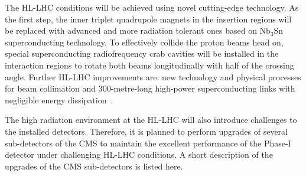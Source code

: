 The HL-LHC conditions will be achieved using novel cutting-edge technology. As the first step, the inner triplet quadrupole magnets in the insertion regions will be replaced with advanced and more radiation tolerant ones based on $\text{Nb}_{3}\text{Sn}$ superconducting technology. To effectively collide the proton beams head on, special superconducting radiofrequency crab cavities will be installed in the interaction regions to rotate both beams longitudinally with half of the crossing angle. Further HL-LHC improvements are: new technology and physical processes for beam collimation and 300-metre-long high-power superconducting links with negligible energy dissipation~\cite{Apollinari:2116337}. 

The high radiation environment at the HL-LHC will also introduce challenges to the installed detectors. Therefore, it is planned to perform upgrades of several sub-detectors of the CMS to maintain the excellent performance of the Phase-I detector under challenging HL-LHC conditions. A short description of the upgrades of the CMS sub-detectors is listed here.
